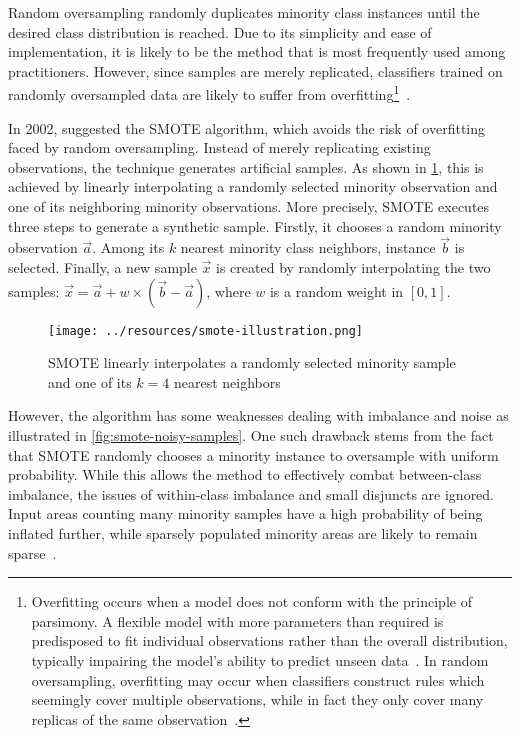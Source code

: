 \documentclass[sort&compress]{elsarticle}
\begin{document}
Random oversampling randomly duplicates minority class instances until the desired class distribution is reached. Due to its simplicity and ease of implementation, it is likely to be the method that is most frequently used among practitioners. However, since samples are merely replicated, classifiers trained on randomly oversampled data are likely to suffer from overfitting\footnote{Overfitting occurs when a model does not conform with the principle of parsimony. A flexible model with more parameters than required is predisposed to fit individual observations rather than the overall distribution, typically impairing the model's ability to predict unseen data~\citep{Hawkins.2004}. In random oversampling, overfitting may occur when classifiers construct rules which seemingly cover multiple observations, while in fact they only cover many replicas of the same observation~\citep{Batista.2004}.}~\citep{Batista.2004,Chawla.2004}.

In 2002, \citet{Chawla.2002} suggested the \ac{SMOTE} algorithm, which avoids the risk of overfitting faced by random oversampling. Instead of merely replicating existing observations, the technique generates artificial samples. As shown in  \cref{fig:smote-illustration}, this is achieved by linearly interpolating a randomly selected minority observation and one of its neighboring minority observations. More precisely, \ac{SMOTE} executes three steps to generate a synthetic sample. Firstly, it chooses a random minority observation $\vec{a}$. Among its $k$ nearest minority class neighbors, instance $\vec{b}$ is selected. Finally, a new sample $\vec{x}$ is created by randomly interpolating the two samples: $\vec{x} = \vec{a} + w \times (\vec{b} - \vec{a})$, where $w$ is a random weight in $[0,1]$.

\begin{figure}[ht]
    \centering
	\texttt{[image: ../resources/smote-illustration.png]}
	\caption{\acs{SMOTE} linearly interpolates a randomly selected minority sample and one of its $k=4$ nearest neighbors}
	\label{fig:smote-illustration}
\end{figure}

However, the algorithm has some weaknesses dealing with imbalance and noise as illustrated in \cref{fig:smote-noisy-samples}. One such drawback stems from the fact that \ac{SMOTE} randomly chooses a minority instance to oversample with uniform probability. While this allows the method to effectively combat between-class imbalance, the issues of within-class imbalance and small disjuncts are ignored. Input areas counting many minority samples have a high probability of being inflated further, while sparsely populated minority areas are likely to remain sparse~\citep{Prati.2004}.
\end{document}
